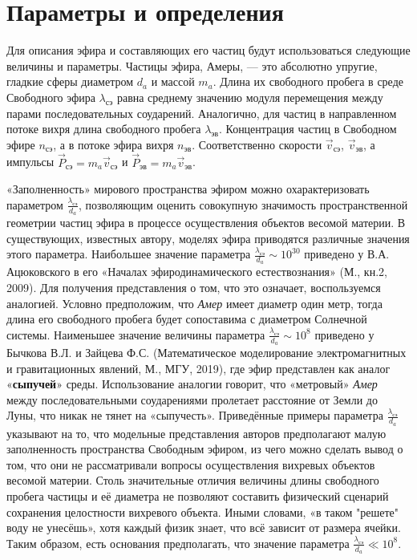 \section{Параметры и определения}

Для описания эфира и составляющих его частиц будут использоваться следующие величины и параметры. Частицы эфира, Амеры, — это абсолютно упругие, гладкие сферы диаметром \(d_a\) и массой \(m_a\). Длина их свободного пробега в среде Свободного эфира \(\lambda_{\text{сэ}}\) равна среднему значению модуля перемещения между парами последовательных соударений. Аналогично, для частиц в направленном потоке вихря длина свободного пробега \(\lambda_{\text{эв}}\). Концентрация частиц в Свободном эфире \(n_{\text{сэ}}\), а в потоке эфира вихря \(n_{\text{эв}}\). Соответственно скорости \(\vec{v}_{\text{сэ}}\), \(\vec{v}_{\text{эв}}\), а импульсы \(\vec{P}_{\text{сэ}} = m_a \vec{v}_{\text{сэ}}\) и \(\vec{P}_{\text{эв}} = m_a \vec{v}_{\text{эв}}\).

«Заполненность» мирового пространства эфиром можно охарактеризовать параметром \(\frac{\lambda_{\text{сэ}}}{d_a}\), позволяющим оценить совокупную значимость пространственной геометрии частиц эфира в процессе осуществления объектов весомой материи. В существующих, известных автору, моделях эфира приводятся различные значения этого параметра. Наибольшее значение параметра \(\frac{\lambda_{\text{сэ}}}{d_a} \sim 10^{30}\) приведено у В.А. Ацюковского в его «Началах эфиродинамического естествознания» (М., кн.2, 2009). Для получения представления о том, что это означает, воспользуемся аналогией. Условно предположим, что \textit{Амер} имеет диаметр один метр, тогда длина его свободного пробега будет сопоставима с диаметром Солнечной системы. Наименьшее значение величины параметра \(\frac{\lambda_{\text{сэ}}}{d_a} \sim 10^{8}\) приведено у Бычкова В.Л. и Зайцева Ф.С. (Математическое моделирование электромагнитных и гравитационных явлений, М., МГУ, 2019), где эфир представлен как аналог «\textbf{сыпучей}» среды. Использование аналогии говорит, что «метровый» \textit{Амер} между последовательными соударениями пролетает расстояние от Земли до Луны, что никак не тянет на «сыпучесть». Приведённые примеры параметра \(\frac{\lambda_{\text{сэ}}}{d_a}\) указывают на то, что модельные представления авторов предполагают малую заполненность пространства Свободным эфиром, из чего можно сделать вывод о том, что они не рассматривали вопросы осуществления вихревых объектов весомой материи. Столь значительные отличия величины длины свободного пробега частицы и её диаметра не позволяют составить физический сценарий сохранения целостности вихревого объекта. Иными словами, «в таком "решете" воду не унесёшь», хотя каждый физик знает, что всё зависит от размера ячейки. Таким образом, есть основания предполагать, что значение параметра \(\frac{\lambda_{\text{сэ}}}{d_a} \ll 10^{8}\).

